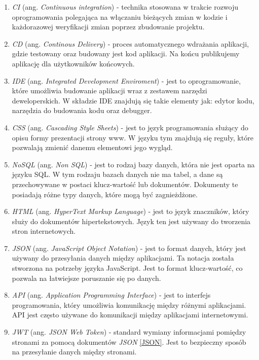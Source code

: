 \begin{enumerate}
    \item \label{CI} \textit{CI} (ang. \textit{Continuous integration}) - technika stosowana w trakcie rozwoju oprogramowania polegająca na włączaniu bieżących zmian w kodzie i każdorazowej weryfikacji zmian poprzez zbudowanie projektu.
    \item \label{CD} \textit{CD} (ang. \textit{Continous Delivery}) - proces automatycznego wdrażania aplikacji, gdzie testowany oraz budowany jest kod aplikacji. Na końcu publikujemy aplikację dla użytkowników końcowych.
    \item \label{IDE} \textit{IDE} (ang. \textit{Integrated Development Enviroment}) - jest to oprogramowanie, które umożliwia budowanie aplikacji wraz z zestawem narzędzi deweloperskich. W składzie IDE znajdują się takie elementy jak: edytor kodu, narzędzia do budowania kodu oraz debugger.
    \item \label{CSS} \textit{CSS} (ang. \textit{Cascading Style Sheets}) - jest to język programowania służący do opisu formy prezentacji strony www. W języku tym znajdują się reguły, które pozwalają zmienić danemu elementowi jego wygląd.
    \item \label{NoSQL} \textit{NoSQL} (ang. \textit{Non SQL}) - jest to rodzaj bazy danych, która nie jest oparta na języku SQL. W tym rodzaju bazach danych nie ma tabel, a dane są przechowywane w postaci klucz-wartość lub dokumentów. Dokumenty te posiadają różne typy danych, które mogą być zagnieżdżone.
    \item \label{HTML} \textit{HTML} (ang. \textit{HyperText Markup Language}) - jest to język znaczników, który służy do dokumentów hipertekstowych. Język ten jest używany do tworzenia stron internetowych.
    \item \label{JSON} \textit{JSON} (ang. \textit{JavaScript Object Notation}) - jest to format danych, który jest używany do przesyłania danych między aplikacjami. Ta notacja została stworzona na potrzeby języka JavaScript. Jest to format klucz-wartość, co pozwala na łatwiejsze poruszanie się po danych.
    \item \label{API} \textit{API} (ang. \textit{Application Programming Interface}) - jest to interfejs programowania, który umożliwia komunikację między różnymi aplikacjami. API jest często używane do komunikacji między aplikacjami internetowymi.
    \item \label{JWT} \textit{JWT} (ang. \textit{JSON Web Token}) - standard wymiany informacjami pomiędzy stronami za pomocą dokumentów \textit{JSON} \ref{JSON}. Jest to bezpieczny sposób na przesyłanie danych między stronami.
\end{enumerate}
